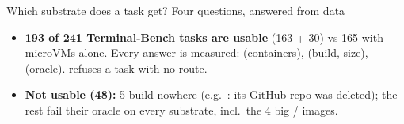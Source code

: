 \begin{frame}{Which substrate does a task get? Four questions, answered from data}
\begin{itemize}\scriptsize\setlength{\itemsep}{0.4mm}
\item \textbf{193 of 241 Terminal-Bench tasks are usable} (163 + 30) vs 165 with microVMs alone. Every answer is measured:  (containers),  (build, size),  (oracle).  refuses a task with no route.
\item \textbf{Not usable (48):} 5 build nowhere (e.g.\ : its GitHub repo was deleted); the rest fail their oracle on every substrate, incl.\ the 4 big / images.
\end{itemize}
\end{frame}

